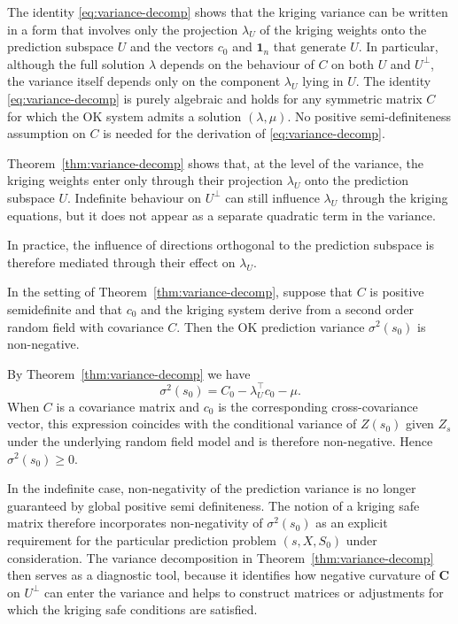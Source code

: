 \documentclass[smallextended]{svjour3}
\newcommand{\1}{\mathbf{1}}
\let\oldcorollary\corollary
\let\endoldcorollary\endcorollary
\renewenvironment{corollary}{\oldcorollary\upshape}{\endoldcorollary}
\let\oldremark\remark
\let\endoldremark\endremark
\renewenvironment{remark}{\oldremark\upshape}{\endoldremark}
\let\oldproof\proof
\let\endoldproof\endproof
\renewenvironment{proof}{\oldproof\upshape}{\endoldproof}
\begin{document}
\begin{remark}
	The identity \eqref{eq:variance-decomp} shows that the kriging variance can be written in a form that involves only the projection $\lambda_U$ of the kriging weights onto the prediction subspace $U$ and the vectors $c_0$ and $\mathbf{1}_n$ that generate $U$. In particular, although the full solution $\lambda$ depends on the behaviour of $C$ on both $U$ and $U^\perp$, the variance itself depends only on the component $\lambda_U$ lying in $U$.
\end{remark}
\begin{remark}
	\label{rem:variance-decomp-algebraic}  
	The identity \eqref{eq:variance-decomp} is purely algebraic and holds for any symmetric matrix $C$ for which the OK system admits a solution $(\lambda,\mu)$. No positive semi-definiteness assumption on $C$ is needed for the derivation of \eqref{eq:variance-decomp}.
\end{remark}

Theorem~\ref{thm:variance-decomp} shows that, at the level of the variance, the kriging weights enter only through their projection $\lambda_U$ onto the prediction subspace $U$. Indefinite behaviour on $U^{\perp}$ can still influence $\lambda_U$ through the kriging equations, but it does not appear as a separate quadratic term in the variance.

In practice, the influence of directions orthogonal to the prediction subspace is therefore mediated through their effect on $\lambda_U$.

\begin{corollary}[Classical non-negativity benchmark]
	\label{cor:variance-nonneg}
	In the setting of Theorem~\ref{thm:variance-decomp}, suppose that $C$ is positive semidefinite and that $c_0$ and the kriging system derive from a second order random field with covariance $C$. Then the OK prediction variance $\sigma^2(s_0)$ is non-negative.
\end{corollary}

\begin{proof}
	By Theorem~\ref{thm:variance-decomp} we have
	\[
	\sigma^2(s_0) = C_0 - \lambda_U^\top c_0 - \mu.
	\]
	When $C$ is a covariance matrix and $c_0$ is the corresponding cross-covariance vector, this expression coincides with the conditional variance of $Z(s_0)$ given $Z_s$ under the underlying random field model and is therefore non-negative. Hence $\sigma^2(s_0) \ge 0$.
\end{proof}

\begin{remark}
	In the indefinite case, non-negativity of the prediction variance is no longer guaranteed by global positive semi definiteness. The notion of a kriging safe matrix therefore incorporates non-negativity of $\sigma^2(s_0)$ as an explicit requirement for the particular prediction problem $(s,X,S_0)$ under consideration. The variance decomposition in Theorem~\ref{thm:variance-decomp} then serves as a diagnostic tool, because it identifies how negative curvature of $\mathbf{C}$ on $U^\perp$ can enter the variance and helps to construct matrices or adjustments for which the kriging safe conditions are satisfied.
\end{remark}
\end{document}
